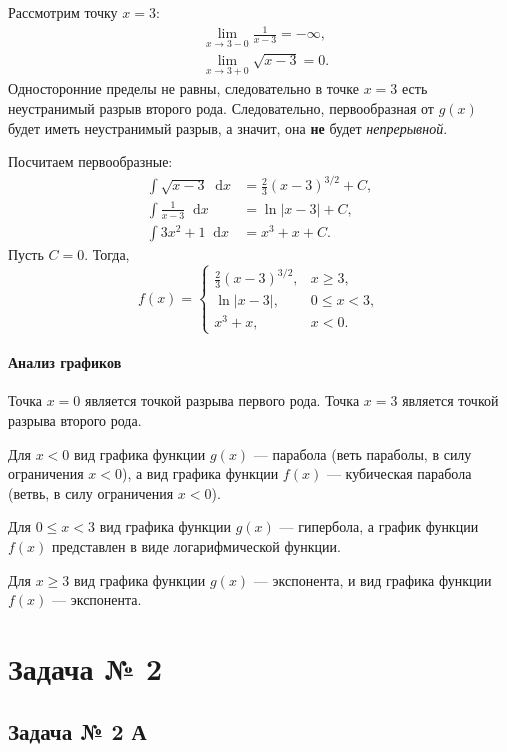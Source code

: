 \documentclass[a4paper,12pt]{article}
\newcommand*\diff{\mathop{}\!\mathrm{d}}
\begin{document}
Рассмотрим точку \(x = 3\):
\begin{align*}
  &\lim_{x \to 3 - 0} \frac{1}{x - 3} = -\infty, \\
  &\lim_{x \to 3 + 0} \sqrt{x - 3} = 0.
\end{align*}
Односторонние пределы не равны, следовательно в точке
\(x = 3\) есть неустранимый разрыв второго рода.
Следовательно, первообразная от \(g(x)\) будет иметь
неустранимый разрыв, а значит, она \textbf{не} будет \textit{непрерывной}.

Посчитаем первообразные:
\begin{align*}
  \int \sqrt{x - 3} \diff x &= \frac{2}{3} {(x - 3)}^{3/2} + C, \\
  \int \frac{1}{x - 3} \diff x &= \ln|x - 3| + C, \\
  \int 3 x^2 + 1 \diff x &= x^3 + x + C.
\end{align*}
Пусть \(C = 0\).
Тогда,
\begin{equation}
  f(x) =
  \begin{cases}
    \frac{2}{3} {(x - 3)}^{3/2}, & x \ge 3, \\
    \ln|x - 3|, & 0 \le x < 3, \\
    x^3 + x, & x < 0.
  \end{cases}
\end{equation}

\paragraph{Анализ графиков}

Точка \(x = 0\) является точкой разрыва первого рода.
Точка \(x = 3\) является точкой разрыва второго рода.

Для \(x < 0\) вид графика функции \(g(x)\) --- парабола
(веть параболы, в силу ограничения \(x < 0\)),
а вид графика функции \(f(x)\) --- кубическая парабола
(ветвь, в силу ограничения \(x < 0\)).

Для \(0 \le x < 3\) вид графика функции \(g(x)\) --- гипербола,
а график функции \(f(x)\) представлен в виде логарифмической функции.

Для \(x \ge 3\) вид графика функции \(g(x)\) --- экспонента,
и вид графика функции \(f(x)\) --- экспонента.

\section{Задача № 2}

\subsection{Задача № 2 А}
\end{document}
